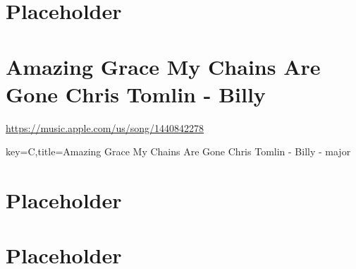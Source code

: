 \documentclass{article}
\begin{document}
\section{Placeholder} \pagebreak

\renewcommand{\cursec}[0]{Amazing Grace My Chains Are Gone Chris Tomlin - Billy}
\section{\cursec}
\backtotoc \quad \url{https://music.apple.com/us/song/1440842278}
\begin{song}[transpose=0,enharmonic=sharp]{key=C,title={\cursec{} -  major}}
  
\end{song}
\medskip
\backtotoc
\pagebreak

\section{Placeholder} \pagebreak
\section{Placeholder} \pagebreak
\end{document}
